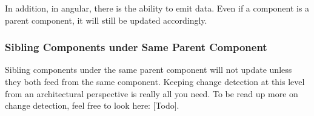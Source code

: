 In addition, in angular, there is the ability to emit data. Even if a component
is a parent component, it will still be updated accordingly.

\subsubsection{ Sibling Components under Same Parent Component }
Sibling components under the same parent component will not update unless they
both feed from the same component. Keeping change detection at this level
from an architectural perspective is really all you need. To be read up more
on change detection, feel free to look here: [Todo].
